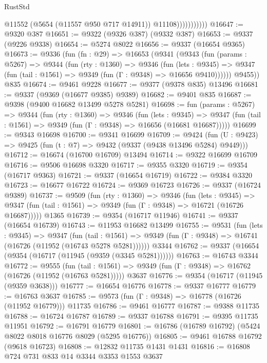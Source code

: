 \begin{lexlean}{RustStd}
\begin{coremodule}
                          @11552
                          (@5654 (@11557 @950 @717 @14911))
                          @11108)))))))))))
@16647 := @9320 @387
@16651 := @9322 (@9326 @387) (@9332 @387)
@16653 := @9337 (@9226 @9338)
@16654 := @5274 @8022
@16656 := @9337 (@16654 @9365)
@16673 := @9336
    (fun (fn : @29) =>
    @16653
      (@9341
        (@9343
          (fun (params : @5267) =>
          @9344
            (fun (rty : @1360) =>
            @9346
              (fun (lets : @9345) =>
              @9347 (fun (tail : @1561) => @9349 (fun (Γ : @9348) => @16656 @9410))))))
        @9455))
    @835
@16674 := @9461 @9228
@16677 := @9377 (@9378 @835) @13496
@16681 := @9337 (@9369 (@16677 @9385) @9389)
@16682 := @9401 @835
@16687 := @9398 (@9400 @16682 @13499 @5278 @5281)
@16698 := fun (params : @5267) =>
  @9344
    (fun (rty : @1360) =>
    @9346
      (fun (lets : @9345) =>
      @9347 (fun (tail : @1561) => @9349 (fun (Γ : @9348) => @16656 (@16681 @16687)))))
@16699 := @9343 @16698
@16700 := @9341 @16699
@16709 := @9424
    (fun (U : @9423) => @9425 (fun (t : @7) => @9432 (@9337 (@9438 @13496 @5284) @9449)))
@16712 := @16674 (@16700 @16709) @13494
@16714 := @9322 @16699 @16709
@16716 := @9506 @16698 @3320
@16717 := @9355 @3320
@16719 := @9354 (@16717 @9363)
@16721 := @9337 (@16654 @16719)
@16722 := @9384 @3320
@16723 := @16677 @16722
@16724 := @9369 @16723
@16726 := @9337 (@16724 @9389)
@16737 := @9509
    (fun (rty : @1360) =>
    @9346
      (fun (lets : @9345) =>
      @9347 (fun (tail : @1561) => @9349 (fun (Γ : @9348) => @16721 (@16726 @16687)))))
    @1365
@16739 := @9354 (@16717 @11946)
@16741 := @9337 (@16654 @16739)
@16743 := @11953 @16682 @13499
@16755 := @9531
    (fun (lets : @9345) =>
    @9347
      (fun (tail : @1561) =>
      @9349 (fun (Γ : @9348) => @16741 (@16726 (@11952 (@16743 @5278 @5281))))))
    @3344
@16762 := @9337 (@16654 (@9354 (@16717 (@11945 (@9359 (@3345 @5281))))))
@16763 := @16743 @3344
@16772 := @9555
    (fun (tail : @1561) => @9349 (fun (Γ : @9348) => @16762 (@16726 (@11952 (@16763 @5281)))))
    @3637
@16776 := @9354 (@16717 (@11945 (@9359 @3638)))
@16777 := @16654 @16776
@16778 := @9337 @16777
@16779 := @16763 @3637
@16785 := @9573 (fun (Γ : @9348) => @16778 (@16726 (@11952 @16779))) @11735
@16786 := @9461 @16777
@16787 := @9388 @11735
@16788 := @16724 @16787
@16789 := @9337 @16788
@16791 := @9395 @11735 @11951
@16792 := @16791 @16779
@16801 := @16786 (@16789 @16792) (@5424 @8022 @8018 @16776 @8029 (@5295 @16776))
@16805 := @9461 @16788 @16792 (@9618 @16723)
@16808 := @12832 @11735 @1431 @1431
@16816 := @16808 @724 @731 @833 @14 @3344 @3353 @1553 @3637

\end{coremodule}
\end{lexlean}

